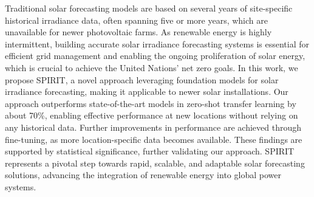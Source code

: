 

Traditional solar forecasting models are based on several years of site-specific historical irradiance data, often spanning five or more years, which are unavailable for newer photovoltaic farms. As renewable energy is highly intermittent, building accurate solar irradiance forecasting systems is essential for efficient grid management and enabling the ongoing proliferation of solar energy, which is crucial to achieve the United Nations' net zero goals. In this work, we propose SPIRIT, a novel approach leveraging foundation models for solar irradiance forecasting, making it applicable to newer solar installations. Our approach outperforms state-of-the-art models in zero-shot transfer learning by about 70\%, enabling effective performance at new locations without relying on any historical data.  Further improvements in performance are achieved through fine-tuning, as more location-specific data becomes available. These findings are supported by statistical significance, further validating our approach. SPIRIT represents a pivotal step towards rapid, scalable, and adaptable solar forecasting solutions, advancing the integration of renewable energy into global power systems.

